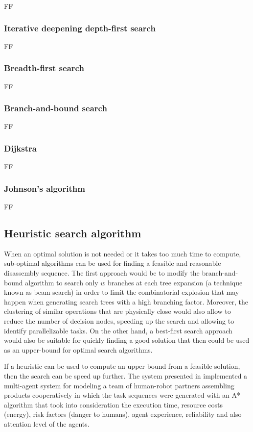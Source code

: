 FF


\subsubsection{Iterative deepening depth-first search}

FF


\subsubsection{Breadth-first search}

FF


\subsubsection{Branch-and-bound search}

FF


\subsubsection{Dijkstra}

FF


\subsubsection{Johnson's algorithm}

FF


\subsection{Heuristic search algorithm}

When an optimal solution is not needed or it takes too much time to compute, sub-optimal algorithms can be used for finding a feasible and reasonable disassembly sequence. The first approach would be to modify the branch-and-bound algorithm \cite{Zhang2010} to search only $w$ branches at each tree expansion (a technique known as beam search) in order to limit the combinatorial explosion that may happen when generating search trees with a high branching factor. Moreover, the clustering of similar operations that are physically close would also allow to reduce the number of decision nodes, speeding up the search and allowing to identify parallelizable tasks. On the other hand, a best-first search approach would also be suitable for quickly finding a good solution that then could be used as an upper-bound for optimal search algorithms.

If a heuristic can be used to compute an upper bound from a feasible solution, then the search can be speed up further. The system presented in \cite{Johannsmeier2017} implemented a multi-agent system for modeling a team of human-robot partners assembling products cooperatively in which the task sequences were generated with an A* algorithm that took into consideration the execution time, resource costs (energy), risk factors (danger to humans), agent experience, reliability and also attention level of the agents.


